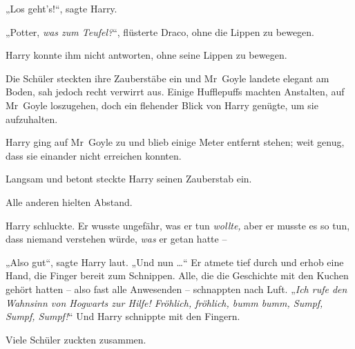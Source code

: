 „Los geht’s!“, sagte Harry.

„Potter, \emph{was zum Teufel?}“, flüsterte Draco, ohne die Lippen zu bewegen.

Harry konnte ihm nicht antworten, ohne seine Lippen zu bewegen.

Die Schüler steckten ihre Zauberstäbe ein und Mr~Goyle landete elegant am Boden, sah jedoch recht verwirrt aus. Einige Hufflepuffs machten Anstalten, auf Mr~Goyle loszugehen, doch ein flehender Blick von Harry genügte, um sie aufzuhalten.

Harry ging auf Mr~Goyle zu und blieb einige Meter entfernt stehen; weit genug, dass sie einander nicht erreichen konnten.

Langsam und betont steckte Harry seinen Zauberstab ein.

Alle anderen hielten Abstand.

Harry schluckte. Er wusste ungefähr, was er tun \emph{wollte,} aber er musste es so tun, dass niemand verstehen würde, \emph{was} er getan hatte –

„Also gut“, sagte Harry laut. „Und nun …“ Er atmete tief durch und erhob eine Hand, die Finger bereit zum Schnippen. Alle, die die Geschichte mit den Kuchen gehört hatten – also fast alle Anwesenden – schnappten nach Luft. „\emph{Ich rufe den Wahnsinn von Hogwarts zur Hilfe! Fröhlich, fröhlich, bumm bumm, Sumpf, Sumpf, Sumpf!}“ Und Harry schnippte mit den Fingern.

Viele Schüler zuckten zusammen.

